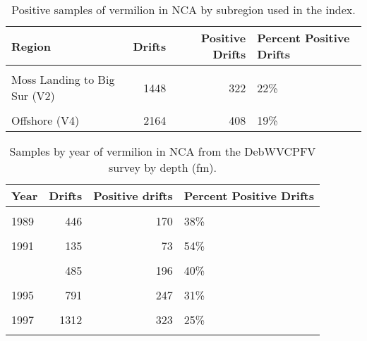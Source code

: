 \documentclass[
]{article}
\begin{document}
\begin{table}

\caption{\label{tab:tab-region-debwv}Positive samples of vermilion in NCA by subregion used in the index.}
\centering
\begin{tabular}[t]{lrrl}
\toprule
Region & Drifts & Positive Drifts & Percent Positive Drifts\\
\midrule
\cellcolor{gray!6}{Ft. Bragg to Santa Cruz (V1)} & \cellcolor{gray!6}{1317} & \cellcolor{gray!6}{362} & \cellcolor{gray!6}{27\%}\\
Moss Landing to Big Sur (V2) & 1448 & 322 & 22\%\\
\cellcolor{gray!6}{San Luis Obispo to Pt. Conception (V3)} & \cellcolor{gray!6}{1668} & \cellcolor{gray!6}{924} & \cellcolor{gray!6}{55\%}\\
Offshore (V4) & 2164 & 408 & 19\%\\
\bottomrule
\end{tabular}
\end{table}

\begin{table}

\caption{\label{tab:tab-year-debwv}Samples by year of vermilion in NCA from the  DebWVCPFV survey by depth (fm).}
\centering
\begin{tabular}[t]{lrrl}
\toprule
Year & Drifts & Positive drifts & Percent Positive Drifts\\
\midrule
\cellcolor{gray!6}{1988} & \cellcolor{gray!6}{422} & \cellcolor{gray!6}{136} & \cellcolor{gray!6}{32\%}\\
1989 & 446 & 170 & 38\%\\
\cellcolor{gray!6}{1990} & \cellcolor{gray!6}{122} & \cellcolor{gray!6}{65} & \cellcolor{gray!6}{53\%}\\
1991 & 135 & 73 & 54\%\\
\cellcolor{gray!6}{1992} & \cellcolor{gray!6}{467} & \cellcolor{gray!6}{168} & \cellcolor{gray!6}{36\%}\\
\addlinespace
1993 & 485 & 196 & 40\%\\
\cellcolor{gray!6}{1994} & \cellcolor{gray!6}{555} & \cellcolor{gray!6}{189} & \cellcolor{gray!6}{34\%}\\
1995 & 791 & 247 & 31\%\\
\cellcolor{gray!6}{1996} & \cellcolor{gray!6}{963} & \cellcolor{gray!6}{238} & \cellcolor{gray!6}{25\%}\\
1997 & 1312 & 323 & 25\%\\
\addlinespace
\cellcolor{gray!6}{1998} & \cellcolor{gray!6}{899} & \cellcolor{gray!6}{211} & \cellcolor{gray!6}{23\%}\\
\bottomrule
\end{tabular}
\end{table}
\end{document}

